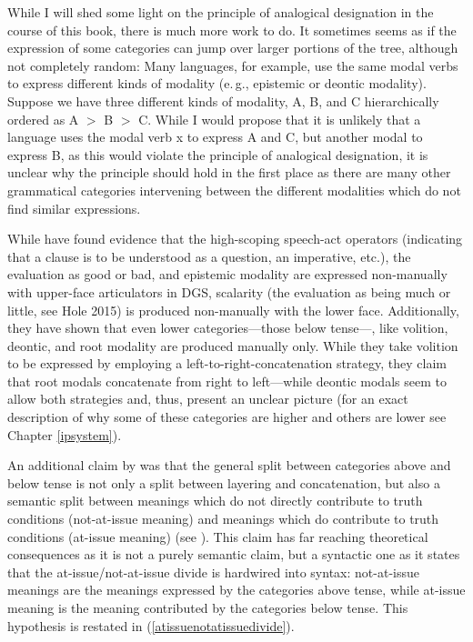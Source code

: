 \begin{savenotes}
\begin{theo}
While I will shed some light on the principle of analogical designation in the course of this book, there is much more work to do. It sometimes seems as if the expression of some categories can jump over larger portions of the tree, although not completely random: Many languages, for example, use the same modal verbs to express different kinds of modality (e.\,g., epistemic or deontic modality). Suppose we have three different kinds of modality, A, B, and C hierarchically ordered as A $>$ B $>$ C. While I would propose that it is unlikely that a language uses the modal verb x to express A and C, but another modal to express B, as this would violate the principle of analogical designation, it is unclear why the principle should hold in the first place as there are many other grammatical categories intervening between the different modalities which do not find similar expressions. 


\end{theo}
\end{savenotes}

\noindent While \citet{bross2017scope} have found evidence that the high-scoping speech-act operators (indicating that a clause is to be understood as a question, an imperative, etc.), the evaluation as good or bad, and epistemic modality are expressed non-manually with upper-face articulators in DGS, scalarity (the evaluation as being much or little, see Hole 2015) is produced non-manually with the lower face. Additionally, they have shown that even lower categories---those below tense---, like volition, deontic, and root modality are produced manually only. While they take volition to be expressed by employing a left-to-right-concatenation strategy, they claim that root modals concatenate from right to left---while deontic modals seem to allow both strategies and, thus, present an unclear picture (for an exact description of why some of these categories are higher and others are lower see Chapter \ref{ipsystem}).

An additional claim by \citet{bross2017scope} was that the general split between categories above and below tense is not only a split between layering and concatenation, but also a semantic split between meanings which do not directly contribute to truth conditions (not-at-issue meaning) and meanings which do contribute to truth conditions (at-issue meaning) (see \citealt{simons2010projects, tonhauser2013toward}). This claim has far reaching theoretical consequences as it is not a purely semantic claim, but a syntactic one as it states that the at-issue/not-at-issue divide is hardwired into syntax: not-at-issue meanings are the meanings expressed by the categories above tense, while at-issue meaning is the meaning contributed by the categories below tense. This hypothesis is restated in (\ref{atissuenotatissuedivide}).

